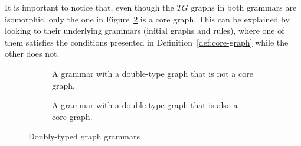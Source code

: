 \begin{example}
  It is important to notice that, even though the $TG$ graphs in both grammars are isomorphic, only the one in Figure~\ref{fig:process:core-graph:example} is a core graph. This can be explained by looking to their underlying grammars (initial graphs and rules), where one of them satisfies the conditions presented in Definition~\ref{def:core-graph} while the other does not.
\begin{figure}[!ht]
  \centering
  \begin{subfigure}[t]{.5\textwidth}
    \centerline{}
    \caption{A grammar with a double-type graph that is not a core graph.}\label{fig:process:core-graph:counter-example}
  \end{subfigure}
  \begin{subfigure}[t]{.5\textwidth}
    \centerline{}
    \caption{A grammar with a double-type graph that is also a core graph.}\label{fig:process:core-graph:example}
  \end{subfigure}

  \caption{Doubly-typed graph grammars}\label{fig:process:doubly-typed-grammars}
\end{figure}

\end{example}

